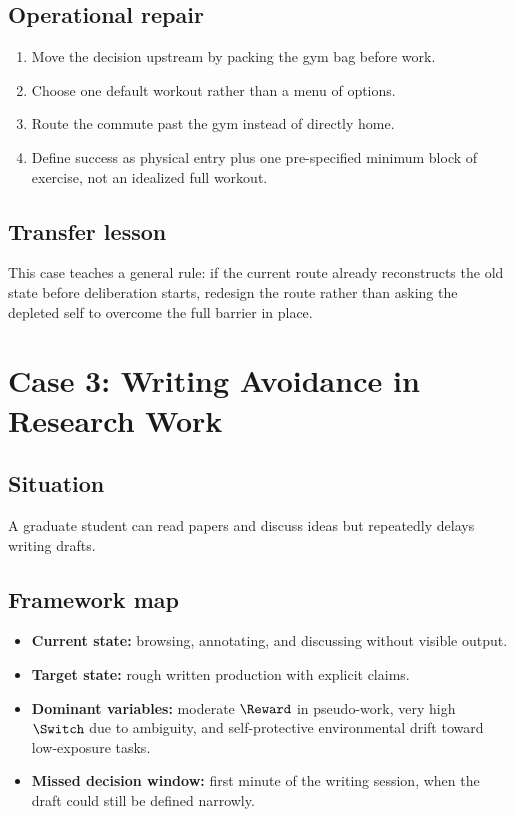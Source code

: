 \subsection*{Operational repair}
\begin{enumerate}[nosep]
  \item Move the decision upstream by packing the gym bag before work.
  \item Choose one default workout rather than a menu of options.
  \item Route the commute past the gym instead of directly home.
  \item Define success as physical entry plus one pre-specified minimum block
        of exercise, not an idealized full workout.
\end{enumerate}

\subsection*{Transfer lesson}
This case teaches a general rule: if the current route already reconstructs
the old state before deliberation starts, redesign the route rather than asking
the depleted self to overcome the full barrier in place.

\section{Case 3: Writing Avoidance in Research Work}

\subsection*{Situation}
A graduate student can read papers and discuss ideas but repeatedly delays
writing drafts.

\subsection*{Framework map}
\begin{itemize}[nosep]
  \item \textbf{Current state:} browsing, annotating, and discussing without
        visible output.
  \item \textbf{Target state:} rough written production with explicit claims.
  \item \textbf{Dominant variables:} moderate $\Reward$ in pseudo-work, very
        high $\Switch$ due to ambiguity, and self-protective environmental
        drift toward low-exposure tasks.
  \item \textbf{Missed decision window:} first minute of the writing session,
        when the draft could still be defined narrowly.
\end{itemize}

